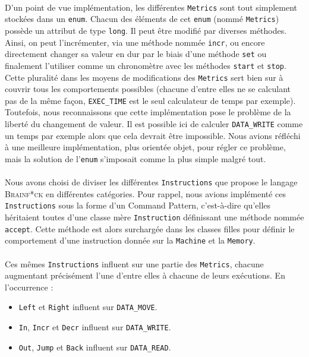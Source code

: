 \documentclass[a4paper]{article}
\begin{document}
\paragraph{}D'un point de vue implémentation, les différentes \texttt{Metrics} sont tout simplement stockées dans un \texttt{enum}. Chacun des éléments de cet \texttt{enum} (nommé \texttt{Metrics}) possède un attribut de type \texttt{long}. Il peut être modifié par diverses méthodes. Ainsi, on peut l'incrémenter, via une méthode nommée \texttt{incr}, ou encore directement changer sa valeur en dur par le biais d'une méthode \texttt{set} ou finalement l'utiliser comme un chronomètre avec les méthodes \texttt{start} et \texttt{stop}. Cette pluralité dans les moyens de modifications des \texttt{Metrics} sert bien sur à couvrir  tous les comportements possibles (chacune d'entre elles ne se calculant pas de la même façon, \texttt{EXEC\_TIME} est le seul calculateur de temps par exemple). Toutefois, nous reconnaissons que cette implémentation pose le problème de la liberté du changement de valeur. Il est possible ici de calculer \texttt{DATA\_WRITE} comme un temps par exemple alors que cela devrait être impossible. Nous avions réfléchi à une meilleure implémentation, plus orientée objet, pour régler ce problème, mais la solution de l'\texttt{enum} s'imposait comme la plus simple malgré tout.

\paragraph{}Nous avons choisi de diviser les différentes \texttt{Instructions} que propose le langage \textsc{Brainf*ck} en différentes catégories. Pour rappel, nous avions implémenté ces \texttt{Instructions} sous la forme d'un Command Pattern, c'est-à-dire qu'elles héritaient toutes d'une classe mère \texttt{Instruction} définissant une méthode nommée \texttt{accept}. Cette méthode est alors surchargée dans les classes filles pour définir le comportement d'une instruction donnée sur la \texttt{Machine} et la \texttt{Memory}.

\paragraph{}Ces mêmes \texttt{Instructions} influent sur une partie des \texttt{Metrics}, chacune augmentant précisément l'une d'entre elles à chacune de leurs exécutions. En l'occurrence :
\begin{itemize}
	\item \texttt{Left} et \texttt{Right} influent sur \texttt{DATA\_MOVE}.
	\item \texttt{In}, \texttt{Incr} et \texttt{Decr} influent sur \texttt{DATA\_WRITE}.
	\item \texttt{Out}, \texttt{Jump} et \texttt{Back} influent sur \texttt{DATA\_READ}.
\end{itemize}
\end{document}
